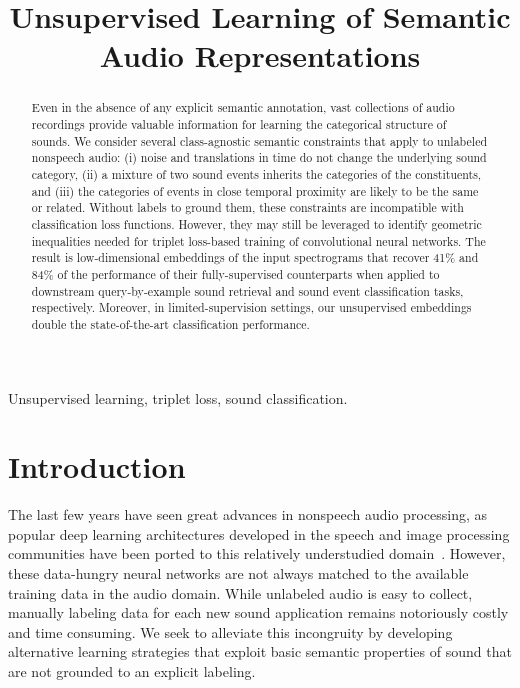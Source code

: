 \documentclass{article}
\title{Unsupervised Learning of Semantic Audio Representations}
\begin{document}
\ninept
\maketitle
\begin{abstract}
Even in the absence of any explicit semantic annotation, vast collections of
audio recordings provide valuable information for learning the categorical
structure of sounds.  We consider several class-agnostic semantic constraints
that apply to unlabeled nonspeech audio: (i) noise and translations in time do
not change the underlying sound category, (ii) a mixture of two sound events
inherits the categories of the constituents, and (iii) the categories of events
in close temporal proximity are likely to be the same or related.  Without
labels to ground them, these constraints are incompatible with classification
loss functions. However, they may still be leveraged to identify geometric
inequalities needed for triplet loss-based training of convolutional neural
networks.  The result is low-dimensional embeddings of the input spectrograms
that recover 41\% and 84\% of the performance of their fully-supervised
counterparts when applied to downstream query-by-example sound retrieval and
sound event classification tasks, respectively.  Moreover, in
limited-supervision settings, our unsupervised embeddings double the
state-of-the-art classification performance.
\end{abstract}

\begin{keywords}
Unsupervised learning, triplet loss, sound classification.
\end{keywords}

\section{Introduction}
\label{sec:intro}

The last few years have seen great advances in nonspeech audio processing, as
popular deep learning architectures developed in the speech and image processing
communities have been ported to this relatively understudied
domain~\cite{takahashi2016deep,hershey2017cnn,cakir2017convolutional,wang2017first}.
However, these data-hungry neural networks are not always matched to the
available training data in the audio domain. While unlabeled audio is easy to
collect, manually labeling data for each new sound application remains
notoriously costly and time consuming.  We seek to alleviate this incongruity by
developing alternative learning strategies that exploit basic semantic
properties of sound that are not grounded to an explicit labeling.
\end{document}

